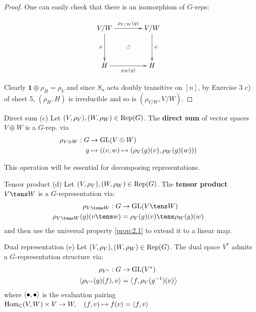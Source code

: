 \documentclass[twoside = false,	%
		headsepline,		%
		parskip = true,
		]{scrbook}						%
\begin{document}
\begin{proof}
        One can easily check that there is an isomorphism of $G$-reps:
        
        \begin{equation*}
        \xymatrix@C=40pt @R=40pt {
            V/W \ar^{\rho_{V/W}(g)}[r] \ar[d]_{\varphi} & V/W\ar[d]^{\varphi} \\
            H \ar[r]_{\rho_H(g)} & H\ar@{}|{\circlearrowleft}[ul]
        }
        \end{equation*}
        
        Clearly $\mathbf{1} \oplus \rho_H = \rho_V$ and since $S_n$ acts doubly transitive on $[n]$, by Exercise 3 c) of sheet 5, $(\rho_H,H)$ is irreducible and so is $(\rho_{V/W},V/W)$.
    \end{proof}
     
    \begin{definition*}
    {Direct sum (c)}
        Let $(V,\rho_V), (W,\rho_W) \in \mathrm{Rep}(G)$. The \textbf{direct sum} of vector spaces $V \oplus W$ is a $G$-rep. via
        \begin{equation*}
        \begin{split}
            \rho_{V \oplus W}: G &\to \mathrm{GL}(V \oplus W) \\
                            g &\mapsto \left( (v,w) \mapsto (\rho_V(g)(v),\rho_W(g)(w))\right)
        \end{split}
        \end{equation*}
    \end{definition*}
    This operation will be essential for decomposing representations.
    
    \begin{definition*}
    {Tensor product (d)}
        Let $(V,\rho_V), (W,\rho_W) \in \mathrm{Rep}(G)$. The \textbf{tensor product} $V \tens W$ is a $G$-representation via:
        \begin{equation*}
        \begin{split}
            \rho_{V \tens W}: G &\to \GL(V \tens W) \\
                    \rho_{V \tens W}(g)(v \tens w) &= \rho_V(g)(v) \tens \rho_W(g)(w)
        \end{split}
        \end{equation*}
        and then use the universal property \ref{prop:2.1} to extend it to a linear map.
    \end{definition*}

    \begin{definition*}
    {Dual representation (e)}
        Let $(V,\rho_V), (W,\rho_W) \in \mathrm{Rep}(G)$. The dual space $V^*$ admits a $G$-representation structure via:
        \begin{equation*}
        \begin{split}
            \rho_{V^*}: G &\to\mathrm{GL}(V^*) \\
                \left\langle \rho_{V^*}(g)(f),v\right\rangle &= \left\langle f,\rho_V(g^{-1})(v)\right\rangle
        \end{split}
        \end{equation*}
        where $\left\langle \bullet,\bullet\right\rangle$ is the evaluation pairing $\mathrm{Hom}_\mathbb C(V,W) \times V \to W, \quad (f,v) \mapsto f(v) = \left\langle f,v\right\rangle$
    \end{definition*}
    
\end{document}
